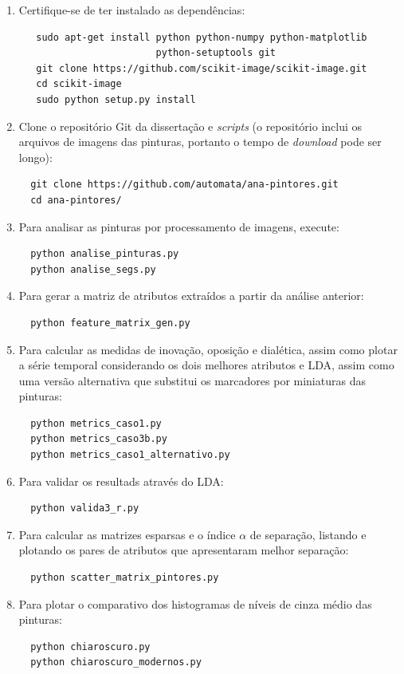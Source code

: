 \begin{enumerate}
  \item Certifique-se de ter instalado as dependências:
\begin{verbatim}
   sudo apt-get install python python-numpy python-matplotlib
                        python-setuptools git
   git clone https://github.com/scikit-image/scikit-image.git
   cd scikit-image
   sudo python setup.py install
\end{verbatim}
  \item Clone o repositório Git da dissertação e \textit{scripts} (o repositório
    inclui os arquivos de imagens das pinturas, portanto o tempo de
    \textit{download} pode ser longo):
\begin{verbatim}
  git clone https://github.com/automata/ana-pintores.git
  cd ana-pintores/
\end{verbatim}
  \item Para analisar as pinturas por processamento de imagens, execute:
\begin{verbatim}
  python analise_pinturas.py
  python analise_segs.py
\end{verbatim}
  \item Para gerar a matriz de atributos extraídos a partir da análise anterior:
\begin{verbatim}
  python feature_matrix_gen.py
\end{verbatim}
  \item Para calcular as medidas de inovação, oposição e dialética, assim como
    plotar a série temporal considerando os dois melhores atributos e LDA, assim
    como uma versão alternativa que substitui os marcadores por miniaturas das
    pinturas:
\begin{verbatim}
  python metrics_caso1.py
  python metrics_caso3b.py
  python metrics_caso1_alternativo.py
\end{verbatim}
  \item Para validar os resultads através do LDA:
\begin{verbatim}
  python valida3_r.py
\end{verbatim}
  \item Para calcular as matrizes esparsas e o índice $\alpha$ de separação,
    listando e plotando os pares de atributos que apresentaram melhor separação: 
\begin{verbatim}
  python scatter_matrix_pintores.py
\end{verbatim}
  \item Para plotar o comparativo dos histogramas de níveis de cinza médio das pinturas:
\begin{verbatim}
  python chiaroscuro.py
  python chiaroscuro_modernos.py
\end{verbatim}
\end{enumerate}


